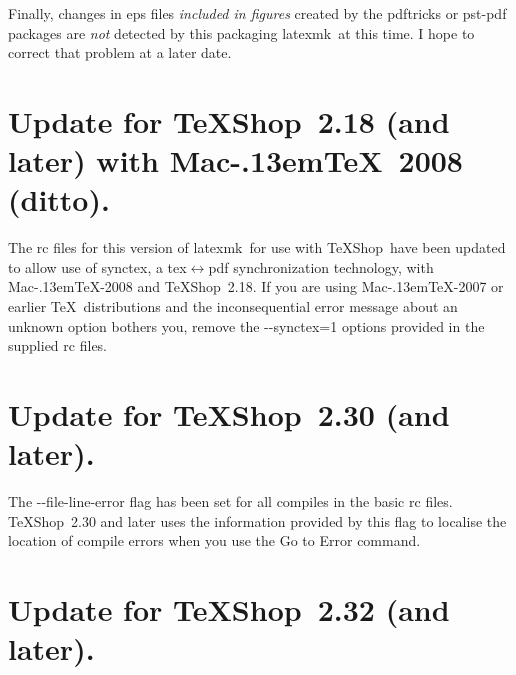 \documentclass[11pt]{article}
\newcommand{\mnu}[1]{\textsf{#1}}
\newcommand{\cmd}[1]{\textsf{#1}}
\newcommand{\MacTeX}{Mac\kern-.13em\TeX}
\newcommand{\TS}{\textsf{\TeX Shop}}
\newcommand{\latexmk}{\textsf{latexmk}}
\begin{document}

Finally, changes in \cmd{eps} files \emph{included in figures} created by the \cmd{pdftricks} or \cmd{pst-pdf} packages are \emph{not} detected by this packaging \latexmk\ at this time. I hope to correct that problem at a later date.

\section{Update for \TS\ 2.18 (and later) with \MacTeX\ 2008 (ditto).}

The \cmd{rc} files for this version of \latexmk\ for use with \TS\ have been updated to allow use of \cmd{synctex}, a \cmd{tex\(\leftrightarrow\)pdf} synchronization technology, with \cmd{\MacTeX-2008} and \TS\ 2.18. If you are using \cmd{\MacTeX-2007} or earlier \TeX\ distributions and the inconsequential error message about an unknown option bothers you, remove the \cmd{-{}-synctex=1} options provided in the supplied \cmd{rc} files.

\section{Update for \TS\ 2.30 (and later).}

The \cmd{-{}-file-line-error} flag has been set for all compiles in the basic \cmd{rc} files. \TS\ 2.30 and later uses the information provided by this flag to localise the location of compile errors when you use the \mnu{Go to Error} command.

\section{Update for \TS\ 2.32 (and later).}
\end{document}
